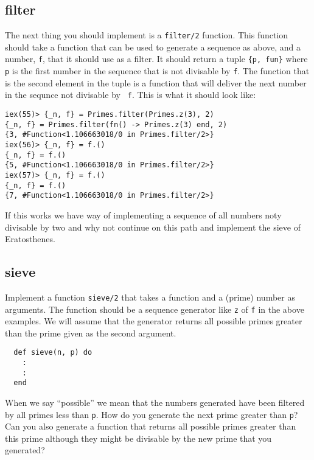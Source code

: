 \documentclass[a4paper,11pt]{article}
\begin{document}
\subsection*{filter}

The next thing you should implement is a {\tt filter/2} function. This
function should take a function that can be used to generate a
sequence as above, and a number, {\tt f}, that it should use as a
filter. It should return a tuple {\tt \{p, fun\}} where {\tt p} is
the first number in the sequence that is not divisable by {\tt f}. The
function that is the second element in the tuple is a function that
will deliver the next number in the sequnce not divisable by {\tt
  f}. This is what it should look like:

\begin{verbatim}
iex(55)> {_n, f} = Primes.filter(Primes.z(3), 2)
{_n, f} = Primes.filter(fn() -> Primes.z(3) end, 2)
{3, #Function<1.106663018/0 in Primes.filter/2>}
iex(56)> {_n, f} = f.()
{_n, f} = f.()
{5, #Function<1.106663018/0 in Primes.filter/2>}
iex(57)> {_n, f} = f.()
{_n, f} = f.()
{7, #Function<1.106663018/0 in Primes.filter/2>}
\end{verbatim}

If this works we have way of implementing a sequence of all numbers
noty divisable by two and why not continue on this path and implement
the sieve of Eratosthenes.

\subsection*{sieve}

Implement a function {\tt sieve/2} that takes a function and a (prime)
number as arguments. The function should be a sequence generator like
{\tt z} of {\tt f} in the above examples. We will assume that the
generator returns all possible primes greater than the prime given as
the second argument.

\begin{verbatim}
  def sieve(n, p) do
    :
    :
  end
\end{verbatim}

When we say ``possible'' we mean that the numbers generated have been
filtered by all primes less than {\tt p}. How do you generate the next
prime greater than {\tt p}? Can you also generate a function that
returns all possible primes greater than this prime although they
might be divisable by the new prime that you generated?
\end{document}
